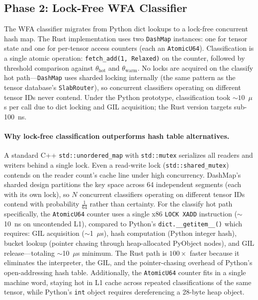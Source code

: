 \documentclass[11pt,letterpaper]{article}
\begin{document}
\subsection{Phase 2: Lock-Free WFA Classifier}

The WFA classifier migrates from Python dict lookups to a lock-free concurrent hash map. The Rust implementation uses two \texttt{DashMap} instances: one for tensor state and one for per-tensor access counters (each an \texttt{AtomicU64}). Classification is a single atomic operation: \texttt{fetch\_add(1, Relaxed)} on the counter, followed by threshold comparison against $\theta_{\text{hot}}$ and $\theta_{\text{warm}}$. No locks are acquired on the classify hot path---\texttt{DashMap} uses sharded locking internally (the same pattern as the tensor database's \texttt{SlabRouter}), so concurrent classifiers operating on different tensor IDs never contend. Under the Python prototype, classification took ${\sim}10$~$\mu$s per call due to dict locking and GIL acquisition; the Rust version targets sub-100~ns.

\paragraph{Why lock-free classification outperforms hash table alternatives.}
A standard C++ \texttt{std::unordered\_map} with \texttt{std::mutex} serializes all readers and writers behind a single lock. Even a read-write lock (\texttt{std::shared\_mutex}) contends on the reader count's cache line under high concurrency. DashMap's sharded design partitions the key space across 64 independent segments (each with its own lock), so $N$ concurrent classifiers operating on different tensor IDs contend with probability $\frac{1}{64}$ rather than certainty. For the classify hot path specifically, the \texttt{AtomicU64} counter uses a single x86 \texttt{LOCK XADD} instruction (${\sim}$10~ns on uncontended L1), compared to Python's \texttt{dict.\_\_getitem\_\_()} which requires: GIL acquisition (${\sim}$1~$\mu$s), hash computation (Python integer hash), bucket lookup (pointer chasing through heap-allocated PyObject nodes), and GIL release---totaling ${\sim}$10~$\mu$s minimum. The Rust path is $100\times$ faster because it eliminates the interpreter, the GIL, and the pointer-chasing overhead of Python's open-addressing hash table. Additionally, the \texttt{AtomicU64} counter fits in a single machine word, staying hot in L1 cache across repeated classifications of the same tensor, while Python's \texttt{int} object requires dereferencing a 28-byte heap object.
\end{document}
